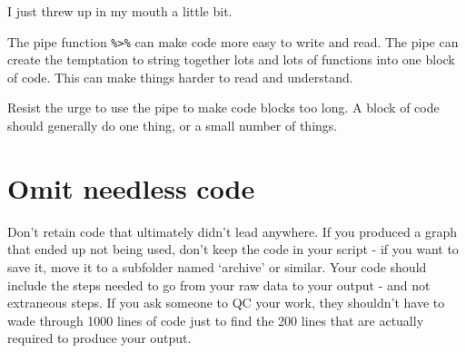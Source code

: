 \documentclass[]{book}
\newenvironment{Shaded}{\begin{snugshade}}{\end{snugshade}}
\newcommand{\DataTypeTok}[1]{\textcolor[rgb]{0.13,0.29,0.53}{#1}}
\newcommand{\DecValTok}[1]{\textcolor[rgb]{0.00,0.00,0.81}{#1}}
\newcommand{\ErrorTok}[1]{\textcolor[rgb]{0.64,0.00,0.00}{\textbf{#1}}}
\newcommand{\KeywordTok}[1]{\textcolor[rgb]{0.13,0.29,0.53}{\textbf{#1}}}
\newcommand{\NormalTok}[1]{#1}
\newcommand{\OperatorTok}[1]{\textcolor[rgb]{0.81,0.36,0.00}{\textbf{#1}}}
\newcommand{\StringTok}[1]{\textcolor[rgb]{0.31,0.60,0.02}{#1}}
\begin{document}
\begin{Shaded}
\end{Shaded}

I just threw up in my mouth a little bit.

The pipe function \texttt{\%\textgreater{}\%} can make code more easy to write and read. The pipe can create the temptation to string together lots and lots of functions into one block of code. This can make things harder to read and understand.

Resist the urge to use the pipe to make code blocks too long. A block of code should generally do one thing, or a small number of things.

\hypertarget{omit-needless-code}{%
\section{Omit needless code}\label{omit-needless-code}}

Don't retain code that ultimately didn't lead anywhere. If you produced a graph that ended up not being used, don't keep the code in your script - if you want to save it, move it to a subfolder named `archive' or similar. Your code should include the steps needed to go from your raw data to your output - and not extraneous steps. If you ask someone to QC your work, they shouldn't have to wade through 1000 lines of code just to find the 200 lines that are actually required to produce your output.
\end{document}
